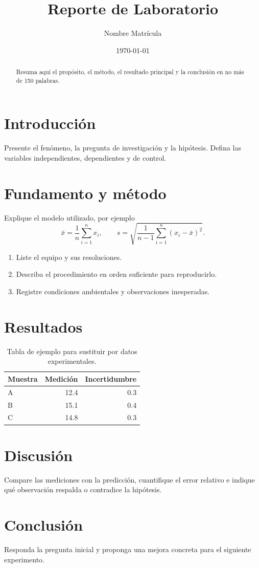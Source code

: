 \documentclass[11pt]{article}
\title{Reporte de Laboratorio}\author{Nombre \hspace{2cm} Matrícula}
\date{\today}
\begin{document}
\maketitle
\begin{abstract}
Resuma aquí el propósito, el método, el resultado principal y la conclusión
en no más de 150 palabras.
\end{abstract}
\section{Introducción}
Presente el fenómeno, la pregunta de investigación y la hipótesis. Defina las
variables independientes, dependientes y de control.
\section{Fundamento y método}
Explique el modelo utilizado, por ejemplo
\[
  \bar{x}=\frac{1}{n}\sum_{i=1}^{n}x_i,\qquad
  s=\sqrt{\frac{1}{n-1}\sum_{i=1}^{n}(x_i-\bar{x})^2}.
\]
\begin{enumerate}
  \item Liste el equipo y sus resoluciones.
  \item Describa el procedimiento en orden suficiente para reproducirlo.
  \item Registre condiciones ambientales y observaciones inesperadas.
\end{enumerate}
\section{Resultados}
\begin{table}[ht]
\centering
\caption{Tabla de ejemplo para sustituir por datos experimentales.}
\begin{tabular}{@{}lrr@{}}\toprule
Muestra & Medición & Incertidumbre \\ \midrule
A & 12.4 & 0.3 \\
B & 15.1 & 0.4 \\
C & 14.8 & 0.3 \\ \bottomrule
\end{tabular}
\end{table}
\section{Discusión}
Compare las mediciones con la predicción, cuantifique el error relativo e
indique qué observación respalda o contradice la hipótesis.
\section{Conclusión}
Responda la pregunta inicial y proponga una mejora concreta para el siguiente
experimento.
\end{document}
